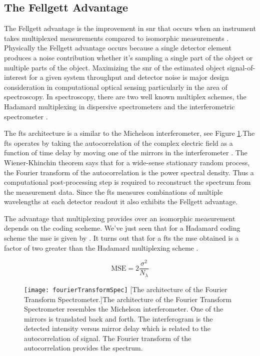 \subsection{The Fellgett Advantage}

The \gls{Fellgett advantage} is the improvement in \gls{snr} that occurs when an instrument takes multiplexed measurements compared to isomorphic measurements \cite{fellgett1958principes, davis2001fourier}. Physically the \gls{Fellgett advantage}  occurs because a single detector element produces a noise contribution whether it's sampling a single part of the object or multiple parts of the object. Maximizing the \acrfull{snr} of the estimated object signal-of-interest for a given system throughput and detector noise is major design consideration in computational optical sensing particularly in the area of spectroscopy. In spectroscopy, there are two well known multiplex schemes, the Hadamard multiplexing in dispersive spectrometers and the interferometric spectrometer . 

The \gls{fts} architecture is a similar to the Michelson interferometer, see Figure \ref{fig:fourierTransformSpec}.The \gls{fts} operates by taking the autocorrelation of the complex electric field as a function of time delay by moving one of the mirrors in the interferometer \cite{davis2001fourier}. The Wiener-Khinchin theorem says that for a wide-sense stationary random process, the Fourier transform of the autocorrelation is the power spectral density. Thus a computational post-processing step is required to reconstruct the spectrum from the measurement data. Since the \gls{fts} measures combinations of multiple wavelengths at each detector readout it also exhibits the \gls{Fellgett advantage}.

The advantage that multiplexing provides over an isomorphic measurement depends on the coding sceheme. We've just seen that for a Hadamard coding scheme the \gls{mse} is given by . It turns out that for a \gls{fts} the \gls{mse} obtained is a factor of two greater than the Hadamard multiplexing scheme \cite{tai1976fourier}. 

\begin{equation}
	\text{MSE} = 2 \frac{\sigma^2}{N_{\lambda}} 
\end{equation}


\begin{figure}
	\texttt{[image: fourierTransformSpec]}
	[The architecture of the Fourier Transform Spectrometer.]{The architecture of the Fourier Transform Spectrometer resembles the Michelson interferometer. One of the mirrors is translated back and forth. The interferogram is the detected intensity versus mirror delay which is related to the autocorrelation of signal. The Fourier transform of the autocorrelation provides the spectrum.}
	\label{fig:fourierTransformSpec}
\end{figure}


